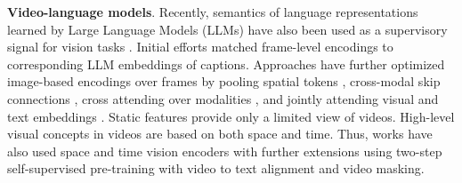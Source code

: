 \documentclass[smallextended,twocolumn,natbib]{svjour3}
\begin{document}
\noindent
\textbf{Video-language models}. Recently, semantics of language representations learned by Large Language Models (LLMs) \citep{brown2020language,touvron2023llama} have also been used as a supervisory signal for vision tasks \citep{li2023blip,liu2024visual,radford2021learning}. Initial efforts \citep{zellers2021merlot} matched frame-level encodings to corresponding LLM embeddings of captions. Approaches have further optimized image-based encodings over frames by pooling spatial tokens \citep{yu2022coca}, cross-modal skip connections \citep{xu2023mplug}, cross attending over modalities \citep{alayrac2022flamingo}, and jointly attending visual and text embeddings \citep{maaz2023video}. Static features provide only a limited view of videos. High-level visual concepts in videos are based on both space and time. Thus, works have also used space and time vision encoders \citep{piergiovanni2024mirasol3b} with further extensions \citep{wang2024internvideo2,zhao2024videoprism} using two-step self-supervised pre-training with video to text alignment and video masking.
\end{document}
